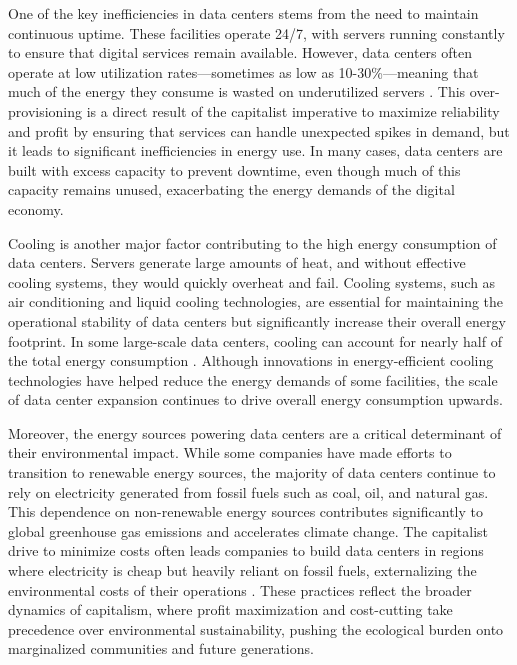 One of the key inefficiencies in data centers stems from the need to maintain continuous uptime. These facilities operate 24/7, with servers running constantly to ensure that digital services remain available. However, data centers often operate at low utilization rates—sometimes as low as 10-30\%—meaning that much of the energy they consume is wasted on underutilized servers \cite[pp.~45-47]{glanz2012}. This over-provisioning is a direct result of the capitalist imperative to maximize reliability and profit by ensuring that services can handle unexpected spikes in demand, but it leads to significant inefficiencies in energy use. In many cases, data centers are built with excess capacity to prevent downtime, even though much of this capacity remains unused, exacerbating the energy demands of the digital economy.

Cooling is another major factor contributing to the high energy consumption of data centers. Servers generate large amounts of heat, and without effective cooling systems, they would quickly overheat and fail. Cooling systems, such as air conditioning and liquid cooling technologies, are essential for maintaining the operational stability of data centers but significantly increase their overall energy footprint. In some large-scale data centers, cooling can account for nearly half of the total energy consumption \cite[pp.~85-87]{smil2018}. Although innovations in energy-efficient cooling technologies have helped reduce the energy demands of some facilities, the scale of data center expansion continues to drive overall energy consumption upwards.

Moreover, the energy sources powering data centers are a critical determinant of their environmental impact. While some companies have made efforts to transition to renewable energy sources, the majority of data centers continue to rely on electricity generated from fossil fuels such as coal, oil, and natural gas. This dependence on non-renewable energy sources contributes significantly to global greenhouse gas emissions and accelerates climate change. The capitalist drive to minimize costs often leads companies to build data centers in regions where electricity is cheap but heavily reliant on fossil fuels, externalizing the environmental costs of their operations \cite[pp.~50-52]{foster2011}. These practices reflect the broader dynamics of capitalism, where profit maximization and cost-cutting take precedence over environmental sustainability, pushing the ecological burden onto marginalized communities and future generations.


